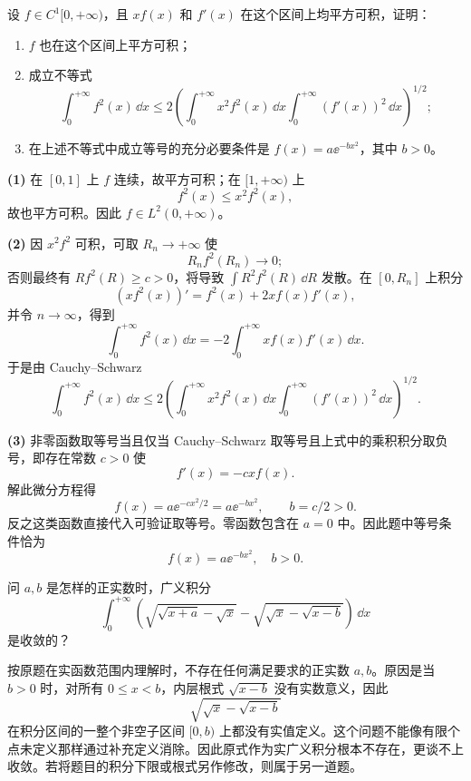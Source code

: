 \begin{xreferenceproblem}[5]
设 $f\in C^1[0,+\infty)$，且 $xf(x)$ 和 $f'(x)$ 在这个区间上均平方可积，证明：
  \begin{enumerate}[label=(\arabic*)]
    \item $f$ 也在这个区间上平方可积；
    \item 成立不等式
    \[
      \int_0^{+\infty}f^2(x)\,\dd x
      \leq2\left(\int_0^{+\infty}x^2f^2(x)\,\dd x\int_0^{+\infty}(f'(x))^2\,\dd x\right)^{1/2};
    \]
    \item 在上述不等式中成立等号的充分必要条件是 $f(x)=a\ee^{-bx^2}$，其中 $b>0$。
  \end{enumerate}
\end{xreferenceproblem}
\begin{xsolution}
\textbf{(1)} 在 $[0,1]$ 上 $f$ 连续，故平方可积；在 $[1,+\infty)$ 上
\[
  f^2(x)\leq x^2f^2(x),
\]
故也平方可积。因此 $f\in L^2(0,+\infty)$。

\textbf{(2)} 因 $x^2f^2$ 可积，可取 $R_n\to+\infty$ 使
\[
  R_nf^2(R_n)\to0;
\]
否则最终有 $Rf^2(R)\geq c>0$，将导致 $\int R^2f^2(R)\,\dd R$ 发散。在 $[0,R_n]$ 上积分
\[
  (xf^2(x))'=f^2(x)+2xf(x)f'(x),
\]
并令 $n\to\infty$，得到
\[
  \int_0^{+\infty}f^2(x)\,\dd x
  =-2\int_0^{+\infty}xf(x)f'(x)\,\dd x.
\]
于是由 Cauchy--Schwarz
\[
  \boxed{
  \int_0^{+\infty}f^2(x)\,\dd x
  \leq2\left(
  \int_0^{+\infty}x^2f^2(x)\,\dd x
  \int_0^{+\infty}(f'(x))^2\,\dd x
  \right)^{1/2}.}
\]

\textbf{(3)} 非零函数取等号当且仅当 Cauchy--Schwarz 取等号且上式中的乘积积分取负号，即存在常数 $c>0$ 使
\[
  f'(x)=-cxf(x).
\]
解此微分方程得
\[
  f(x)=a\ee^{-cx^2/2}=a\ee^{-bx^2},\qquad b=c/2>0.
\]
反之这类函数直接代入可验证取等号。零函数包含在 $a=0$ 中。因此题中等号条件恰为
\[
  \boxed{f(x)=a\ee^{-bx^2},\quad b>0}.
\]
\end{xsolution}


\begin{xreferenceproblem}[6]
问 $a,b$ 是怎样的正实数时，广义积分
  \[
    \int_0^{+\infty}\left(\sqrt{\sqrt{x+a}-\sqrt{x}}-\sqrt{\sqrt{x}-\sqrt{x-b}}\right)\,\dd x
  \]
  是收敛的？
\end{xreferenceproblem}
\begin{xsolution}
按原题在实函数范围内理解时，不存在任何满足要求的正实数 $a,b$。原因是当 $b>0$ 时，对所有 $0\leq x<b$，内层根式 $\sqrt{x-b}$ 没有实数意义，因此
\[
  \sqrt{\sqrt{x}-\sqrt{x-b}}
\]
在积分区间的一整个非空子区间 $[0,b)$ 上都没有实值定义。这个问题不能像有限个点未定义那样通过补充定义消除。因此原式作为实广义积分根本不存在，更谈不上收敛。若将题目的积分下限或根式另作修改，则属于另一道题。
\end{xsolution}


